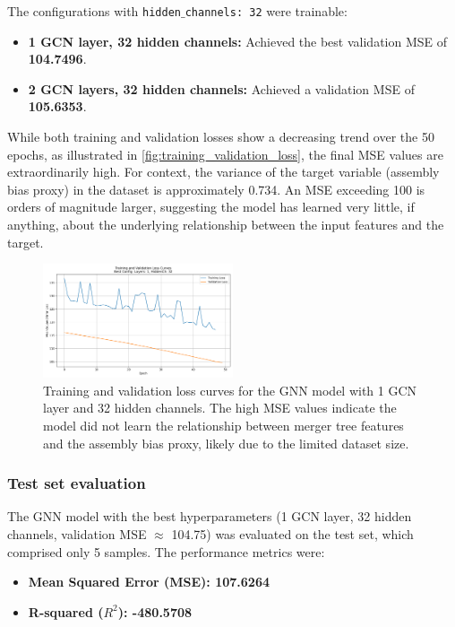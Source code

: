 \documentclass[twocolumn]{aastex631}
\begin{document}
The configurations with \texttt{hidden\ensuremath{\_}channels: 32} were trainable:
\begin{itemize}
    \item \textbf{1 GCN layer, 32 hidden channels:} Achieved the best validation MSE of \textbf{104.7496}.
    \item \textbf{2 GCN layers, 32 hidden channels:} Achieved a validation MSE of \textbf{105.6353}.
\end{itemize}

While both training and validation losses show a decreasing trend over the 50 epochs, as illustrated in \autoref{fig:training_validation_loss}, the final MSE values are extraordinarily high. For context, the variance of the target variable (assembly bias proxy) in the dataset is approximately 0.734. An MSE exceeding 100 is orders of magnitude larger, suggesting the model has learned very little, if anything, about the underlying relationship between the input features and the target.

\begin{figure}[htbp]
    \centering
    \includegraphics[width=0.5\textwidth]{../input_files/plots/training_validation_loss_curves_plot_1_1748137938.png}
    \caption{\label{fig:training_validation_loss}Training and validation loss curves for the GNN model with 1 GCN layer and 32 hidden channels. The high MSE values indicate the model did not learn the relationship between merger tree features and the assembly bias proxy, likely due to the limited dataset size.}
\end{figure}

\subsubsection{Test set evaluation}
The GNN model with the best hyperparameters (1 GCN layer, 32 hidden channels, validation MSE $\approx$ 104.75) was evaluated on the test set, which comprised only 5 samples. The performance metrics were:
\begin{itemize}
    \item \textbf{Mean Squared Error (MSE): 107.6264}
    \item \textbf{R-squared ($R^2$): -480.5708}
\end{itemize}
\end{document}

